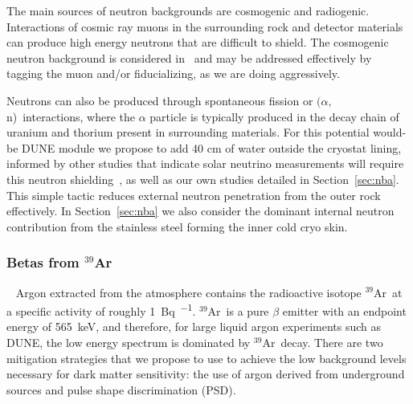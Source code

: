 \documentclass[a4paper,11pt]{article}
\newcommand{\artn}{$^{39}$Ar}
\newcommand{\alphan}{$(\alpha,$ n)}
\begin{document}
The main sources of neutron backgrounds are cosmogenic and radiogenic. Interactions of cosmic ray muons in the surrounding rock and detector materials can produce high energy neutrons that are difficult to shield. The cosmogenic neutron background is considered in~\cite{beacom_bkd} and may be addressed effectively by tagging the muon and/or fiducializing, as we are doing aggressively. 

Neutrons can also be produced through spontaneous fission or \alphan ~interactions, where the $\alpha$ particle is typically produced in the decay chain of uranium and thorium present in surrounding materials.  For this potential would-be DUNE module we propose to add 40 cm of water outside the cryostat lining, informed by other studies that indicate solar neutrino measurements will require this neutron shielding~\cite{beacom_snu}, as well as our own studies detailed in Section~\ref{sec:nba}. This simple tactic reduces external neutron penetration from the outer rock effectively. In Section~\ref{sec:nba} we also consider the dominant internal neutron contribution from the stainless steel forming the inner cold cryo skin.  

\subsubsection{Betas from \artn}~\label{argon39}
Argon extracted from the atmosphere contains the radioactive isotope \artn~at a specific activity of roughly \SI{1}{\becquerel\per\kgar}. \artn~is a pure $\beta$ emitter with an endpoint energy of \SI{565}{keV}, and therefore, for large liquid argon experiments such as DUNE, the low energy spectrum is dominated by \artn~decay. There are two mitigation strategies that we propose to use to achieve the low background levels necessary for dark matter sensitivity: the use of argon derived from underground sources and pulse shape discrimination (PSD).
\end{document}
